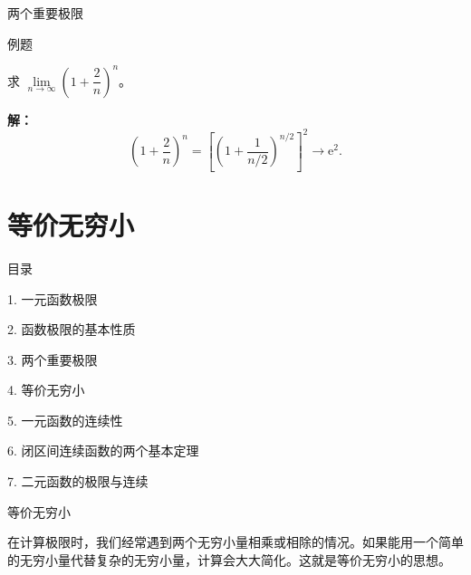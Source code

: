 \documentclass[aspectratio=169,10pt,fontset=fandol]{ctexbeamer}
\newcommand{\ee}{\mathrm{e}}
\begin{document}
\begin{frame}[t,fragile]{两个重要极限}
\footnotesize
\begin{block}{例题}
{\footnotesize
求 \(\lim\limits_{n\to\infty} \left(1 + \dfrac{2}{n}\right)^n\)。

}
\end{block}
\pause
{\footnotesize
\textbf{解：}
\[
	\left(1 + \dfrac{2}{n}\right)^n = \left[\left(1 + \dfrac{1}{n/2}\right)^{n/2}\right]^2 \to \ee^2.
	\]

}
\end{frame}
\section{等价无穷小}
\begin{frame}[t,fragile]{目录}
\normalsize
{\color{black}\normalsize 1. 一元函数极限\par}\vspace{0.3em}
{\color{black}\normalsize 2. 函数极限的基本性质\par}\vspace{0.3em}
{\color{black}\normalsize 3. 两个重要极限\par}\vspace{0.3em}
{\color{blue}\normalsize 4. 等价无穷小\par}\vspace{0.3em}
{\color{gray!40}\normalsize 5. 一元函数的连续性\par}\vspace{0.3em}
{\color{gray!40}\normalsize 6. 闭区间连续函数的两个基本定理\par}\vspace{0.3em}
{\color{gray!40}\normalsize 7. 二元函数的极限与连续\par}\vspace{0.3em}
\end{frame}
\begin{frame}[t,fragile]{等价无穷小}
\footnotesize
{\footnotesize
在计算极限时，我们经常遇到两个无穷小量相乘或相除的情况。如果能用一个简单的无穷小量代替复杂的无穷小量，计算会大大简化。这就是等价无穷小的思想。


}
\end{frame}
\end{document}
